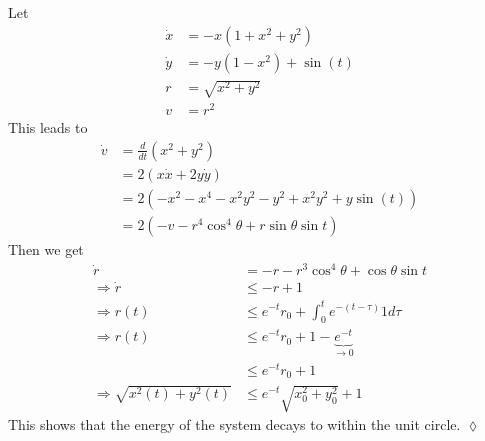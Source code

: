 \begin{example}
Let
\begin{align*}
\dot{x} &= -x(1+x^2+y^2) \\
\dot{y} &= -y(1-x^2)+\sin(t) \\
r &= \sqrt{x^2+y^2} \\
v &= r^2
\end{align*}
This leads to
\begin{align*}
\dot{v} &= \frac{d}{dt}(x^2+y^2) \\
&= 2(x\dot{x}+2y\dot{y}) \\
&= 2(-x^2-x^4-x^2y^2-y^2+x^2y^2+y\sin(t)) \\
&= 2(-v-r^4\cos^4\theta+r\sin\theta\sin t)
\end{align*}
Then we get
\begin{align*}
\dot{r} &= -r-r^3\cos^4\theta+\cos\theta\sin t \\
\Rightarrow \dot{r} &\leq -r+1 \\
\Rightarrow r(t) &\leq e^{-t}r_0 + \int_0^t e^{-(t-\tau)}1d\tau \\
\Rightarrow r(t) &\leq e^{-t}r_0 + 1 - \underbrace{e^{-t}}_{\to0} \\
&\leq e^{-t}r_0 + 1 \\
\Rightarrow \sqrt{x^2(t)+y^2(t)} &\leq e^{-t}\sqrt{x_0^2+y_0^2} + 1
\end{align*}
This shows that the energy of the system decays to within the unit circle.
$\lozenge$
\end{example}
